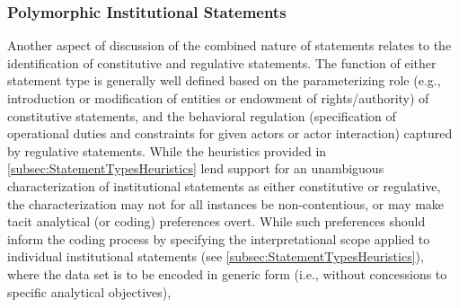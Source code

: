 \clearpairofpagestyles
\chead{\headmark}
\ifoot{\ifootertext}
\ofoot{\ofootertext}
\cfoot{\thepage}

\subsubsection{Polymorphic Institutional Statements}
\label{subsec:SyntacticPolymorphs}

Another aspect of discussion of the combined nature of statements relates to the identification of constitutive and regulative statements. The function of either statement type is generally well defined based on the parameterizing role (e.g., introduction or modification of entities or endowment of rights/authority) of constitutive statements, and the behavioral regulation (specification of operational duties and constraints for given actors or actor interaction) captured by regulative statements. While the heuristics provided in \cref{subsec:StatementTypesHeuristics} lend support for an unambiguous characterization of institutional statements as either constitutive or regulative, the characterization may not for all instances be non-contentious, or may make tacit analytical (or coding) preferences overt. While such preferences should inform the coding process by specifying the interpretational scope applied to individual institutional statements (see \cref{subsec:StatementTypesHeuristics}), where the data set is to be encoded in generic form (i.e., without concessions to specific analytical objectives),  %
%
